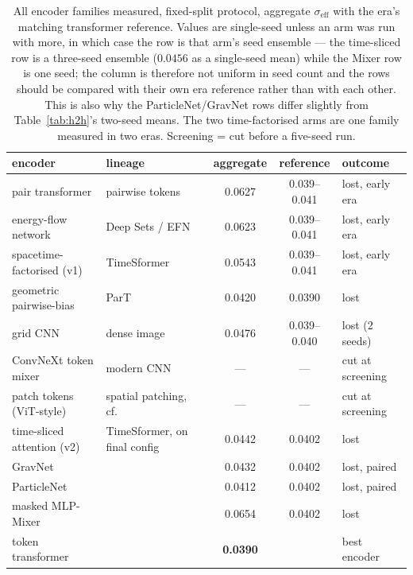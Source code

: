 \documentclass[11pt,a4paper]{article}
\newcommand{\seff}{\ensuremath{\sigma_{\mathrm{eff}}}}
\begin{document}
\begin{table}[h]
\centering
\caption{All encoder families measured, fixed-split protocol, aggregate
\seff{} with the era's matching transformer reference. Values are
single-seed unless an arm was run with more, in which case the row is that
arm's seed ensemble --- the time-sliced row is a three-seed ensemble
($0.0456$ as a single-seed mean) while the Mixer row is one seed; the
column is therefore not uniform in seed count and the rows should be
compared with their own era reference rather than with each other. This is
also why the ParticleNet/GravNet rows differ slightly from
Table~\ref{tab:h2h}'s two-seed means. The two time-factorised arms are one
family measured in two eras. Screening = cut before a five-seed run.}
\label{tab:encoders}
\small
\setlength{\tabcolsep}{4pt}
\begin{tabular}{llccl}
\toprule
encoder & lineage & aggregate & reference & outcome\\
\midrule
pair transformer & pairwise tokens & 0.0627 & 0.039--0.041 & lost, early era\\
energy-flow network & Deep Sets / EFN~\cite{efn} & 0.0623 & 0.039--0.041 & lost, early era\\
spacetime-factorised (v1) & TimeSformer~\cite{timesformer} & 0.0543 & 0.039--0.041 & lost, early era\\
geometric pairwise-bias & ParT~\cite{part} & 0.0420 & 0.0390 & lost\\
grid CNN & dense image & 0.0476 & 0.039--0.040 & lost (2 seeds)\\
ConvNeXt token mixer & modern CNN & --- & --- & cut at screening\\
patch tokens (ViT-style) & spatial patching, cf.~\cite{patchjets} & --- & --- & cut at screening\\
time-sliced attention (v2) & TimeSformer, on final config & 0.0442 & 0.0402 & lost\\
GravNet & \cite{gravnet} & 0.0432 & 0.0402 & lost, paired\\
ParticleNet & \cite{particlenet} & 0.0412 & 0.0402 & lost, paired\\
masked MLP-Mixer & \cite{mixer} & 0.0654 & 0.0402 & lost\\
\midrule
token transformer & \cite{vaswani} & \textbf{0.0390} & & best encoder\\
\bottomrule
\end{tabular}
\end{table}
\end{document}
